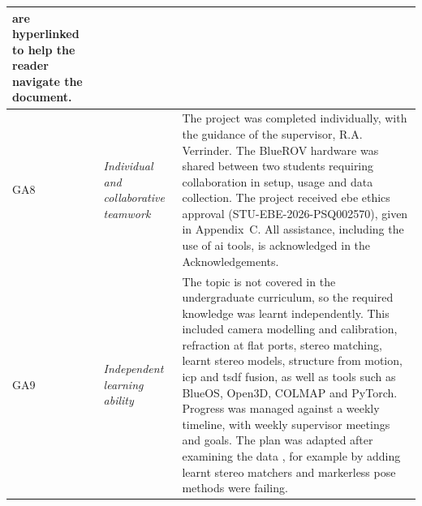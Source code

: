 {\begin{longtable}{>{\raggedright\arraybackslash}p{} >{\raggedright\arraybackslash}p{} >{\noindent\justifying\arraybackslash}p{}}
are hyperlinked to help the reader navigate the document. \\
\cmidrule(lr){1-3}
GA8 & \textit{Individual and collaborative teamwork} &
The project was completed individually, with the guidance of the supervisor, R.A. Verrinder. The BlueROV hardware
was shared between two students requiring collaboration in setup, usage and data collection. The project received \acrshort{ebe} ethics approval
(STU-EBE-2026-PSQ002570), given in Appendix~C. All assistance, including the use of
\acrshort{ai} tools, is acknowledged in the Acknowledgements. \\
\cmidrule(lr){1-3}
GA9 & \textit{Independent learning ability} &
The topic is not covered in the undergraduate curriculum, so the required knowledge was learnt independently.
This included camera modelling and calibration, refraction at flat ports, stereo matching, learnt stereo models,
structure from motion, \acrshort{icp} and \acrshort{tsdf} fusion, as well as tools such as BlueOS, Open3D, COLMAP and PyTorch. Progress was
managed against a weekly timeline, with weekly supervisor meetings and goals. The plan was adapted after examining the data
, for example by adding learnt stereo matchers and markerless pose methods were failing. \\
\bottomrule
\end{longtable}
}






